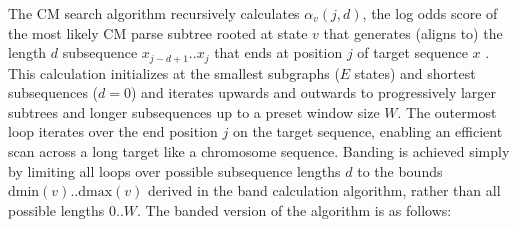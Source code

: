 \documentclass[11pt]{article}
\begin{document}
The CM search algorithm recursively calculates $\alpha_v(j,d)$, the
log odds score of the most likely CM parse subtree rooted at state $v$
that generates (aligns to) the length $d$ subsequence $x_{j-d+1}..x_j$
that ends at position $j$ of target sequence $x$
\cite{Eddy94,Durbin98}. This calculation initializes at the smallest
subgraphs ($E$ states) and shortest subsequences ($d=0$) and iterates
upwards and outwards to progressively larger subtrees and longer
subsequences up to a preset window size $W$. The outermost loop
iterates over the end position $j$ on the target sequence, enabling an
efficient scan across a long target like a chromosome sequence.
Banding is achieved simply by limiting all loops over possible
subsequence lengths $d$ to the bounds $\mbox{dmin}(v)..\mbox{dmax}(v)$
derived in the band calculation algorithm, rather than all possible
lengths $0..W$. The banded version of the algorithm is as follows:
 
\end{document}
